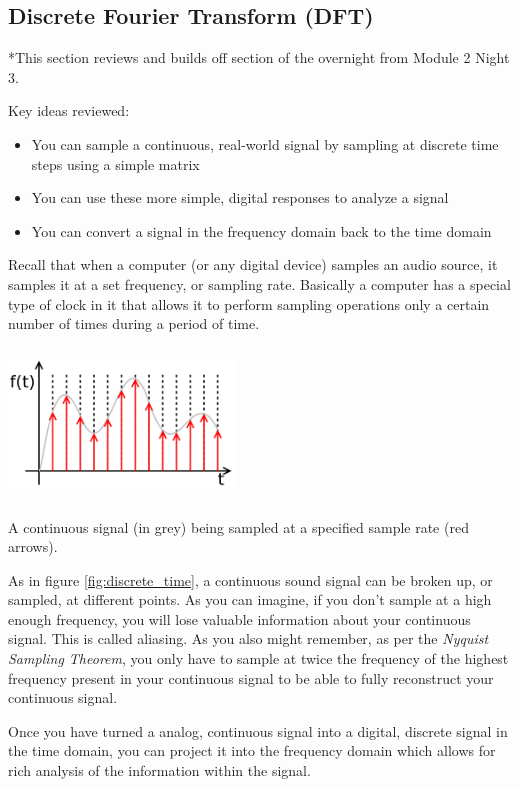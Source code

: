 \documentclass{tufte-handout}
\begin{document}
\subsection{Discrete Fourier Transform (DFT)}
*This section reviews and builds off section of the overnight from Module 2 Night 3.

Key ideas reviewed:
\begin{itemize}
	\item You can sample a continuous, real-world signal by sampling at discrete time steps using a simple matrix
	\item You can use these more simple, digital responses to analyze a signal
	\item You can convert a signal in the frequency domain back to the time domain
\end{itemize}

Recall that when a computer (or any digital device) samples an audio source, it samples it at a set frequency, or sampling rate. Basically a computer has a special type of clock in it that allows it to perform sampling operations only a certain number of times during a period of time. 
 
 \begin{marginfigure}
    \centering
    \includegraphics[width = 6cm, height = 4cm]{discrete_time.png}
    \label{fig:discrete_time}
\caption{A continuous signal (in grey) being sampled at a specified sample rate (red arrows).}
\end{marginfigure}

As in figure \ref{fig:discrete_time}, a continuous sound signal can be broken up, or sampled, at different points. As you can imagine, if you don't sample at a high enough frequency, you will lose valuable information about your continuous signal. This is called aliasing. As you also might remember, as per the \textit{Nyquist Sampling Theorem}, you only have to sample at twice the frequency of the highest frequency present in your continuous signal to be able to fully reconstruct your continuous signal. 

Once you have turned a analog, continuous signal into a digital, discrete signal in the time domain, you can project it into the frequency domain which allows for rich analysis of the information within the signal. 
\end{document}
